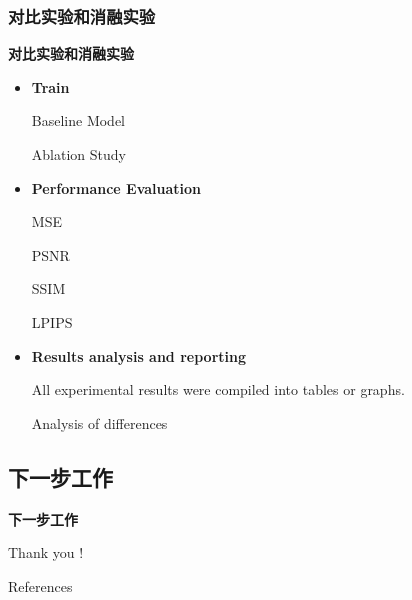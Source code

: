 \documentclass[CJK,aspectratio=169]{beamer}  %
\begin{document}
	\subsubsection{对比实验和消融实验}
	
	\begin{frame}
		{ \yahei \textbf{对比实验和消融实验}}
		\begin{itemize}
			\item \textbf{Train}
			
			\checkmark Baseline Model
			
			\checkmark Ablation Study
		\end{itemize}
		
		\begin{itemize}
			\item \textbf{Performance Evaluation}
			
			\checkmark MSE
			
			\checkmark PSNR
			
			\checkmark SSIM
			
			\checkmark LPIPS
		\end{itemize}
		
		\begin{itemize}
			\item \textbf{Results analysis and reporting}
			
			\checkmark All experimental results were compiled into tables or graphs.
			
			\checkmark Analysis of differences
		\end{itemize}
				
	\end{frame}
	
	\subsection{下一步工作}
	\begin{frame}
		{ \yahei \textbf{下一步工作}}
		
		
	\end{frame}
	
	
	
	\begin{frame}[plain,c]
		\begin{center}
			\Huge Thank you !
		\end{center}
	\end{frame}
	
	\appendix
	\begin{frame}[allowframebreaks]{References}
		\tiny
		
		
	\end{frame}
	
\end{document}
